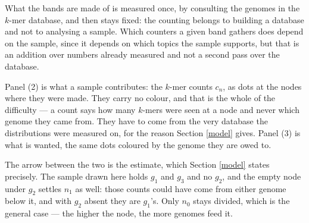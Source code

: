 \documentclass[pdflatex,sn-vancouver-num]{sn-jnl}
\begin{document}
    What the bands are made of is measured once, by consulting the genomes in the $k$-mer database,
    and then stays fixed: the counting belongs to building a database and not to analysing a sample.
    Which counters a given band gathers does depend on the sample, since it depends on which topics
    the sample supports, but that is an addition over numbers already measured and not a second pass
    over the database.

    Panel (2) is what a sample contributes: the $k$-mer counts $c_n$, as dots at the nodes where
    they were made. They carry no colour, and that is the whole of the difficulty --- a count says how many
    $k$-mers were seen at a node and never which genome they came from. They have to come from the
    very database the distributions were measured on, for the reason Section \ref{model} gives.
    Panel (3) is what is wanted, the same dots coloured by the genome they are owed to.

    The arrow between the two is the estimate, which Section \ref{model} states precisely. The
    sample drawn here holds $g_1$ and $g_3$ and no $g_2$, and the empty node under $g_2$ settles
    $n_1$ as well: those counts could have come from either genome below it, and with $g_2$ absent
    they are $g_1$'s. Only $n_0$ stays divided, which is the general case --- the higher
    the node, the more genomes feed it.
\end{document}
